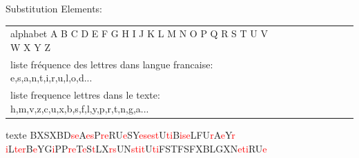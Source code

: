 \documentclass[10pt,xcolor=table]{beamer}
\begin{document}
\begin{frame}
\begin{exampleblock}{Substitution}
Elements:
\begin{tabular}{l!{\vrule}ccccccc} 
alphabet A B C D E F G H I J K L M N O P Q R S T U V W X Y Z \\   
liste fréquence des lettres dans langue francaise: e,s,a,n,t,i,r,u,l,o,d... \\ 
liste frequence lettres dans le texte: h,m,v,z,c,u,x,b,s,f,l,y,p,r,t,n,g,a...
\end{tabular}
\end{exampleblock}
\begin{exampleblock}{texte}
BXSXBD\textcolor{red}{s}\textcolor{red}{e}A\textcolor{red}{e}\textcolor{red}{s}P\textcolor{red}{r}\textcolor{red}{e}RU\textcolor{red}{e}SY\textcolor{red}{e}\textcolor{red}{s}\textcolor{red}{e}\textcolor{red}{s}\textcolor{red}{t}U\textcolor{red}{t}\textcolor{red}{i}B\textcolor{red}{i}\textcolor{red}{s}\textcolor{red}{e}LFU\textcolor{red}{r}A\textcolor{red}{e}Y\textcolor{red}{r}
\textcolor{red}{i}L\textcolor{red}{t}\textcolor{red}{e}\textcolor{red}{r}B\textcolor{red}{e}YG\textcolor{red}{i}PP\textcolor{red}{r}\textcolor{red}{e}T\textcolor{red}{e}S\textcolor{red}{t}LX\textcolor{red}{r}\textcolor{red}{s}UN\textcolor{red}{s}\textcolor{red}{t}\textcolor{red}{i}\textcolor{red}{t}U\textcolor{red}{t}\textcolor{red}{i}FSTFSFXBLGXN\textcolor{red}{e}\textcolor{red}{t}\textcolor{red}{i}RU\textcolor{red}{e}
\end{exampleblock}
\end{frame}
\end{document}
